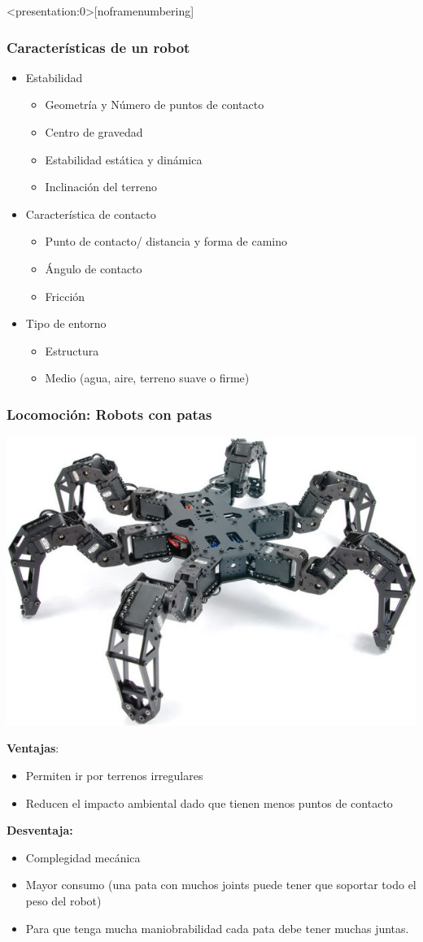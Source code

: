 \begin{frame}<presentation:0>[noframenumbering]
	\frametitle{Características de un robot}
	
	\begin{itemize}
		\item Estabilidad
		\begin{itemize}
			\item Geometría y Número de puntos de contacto
			\item Centro de gravedad
			\item Estabilidad estática y dinámica
			\item Inclinación del terreno
		\end{itemize}
		\item Característica de contacto
		\begin{itemize}
			\item Punto de contacto/ distancia y forma de camino
			\item Ángulo de contacto
			\item Fricción
		\end{itemize}
		\item Tipo de entorno
		\begin{itemize}
			\item Estructura
			\item Medio (agua, aire, terreno suave o firme)
		\end{itemize}
	\end{itemize}
\end{frame}


\begin{frame}
    \frametitle{Locomoción: Robots con patas}

    \begin{center}
        \includegraphics[width=0.4\columnwidth]{images/hexapod_phantomX_mark_II.jpg}
    \end{center}
    \footnotesize
    {\bf Ventajas}:
    \begin{itemize}
        \item Permiten ir por terrenos irregulares
        \item Reducen el impacto ambiental dado que tienen menos puntos de contacto
    \end{itemize}
    {\bf Desventaja: }
    \begin{itemize}
        \item Complegidad mecánica
        \item Mayor consumo (una pata con muchos joints puede tener que soportar todo el peso del robot)
        \item Para que tenga mucha maniobrabilidad cada pata debe tener muchas juntas.
\end{itemize}

\end{frame}


